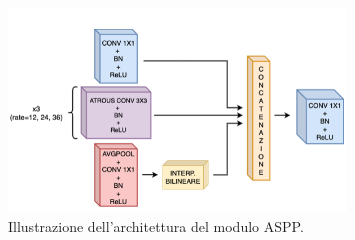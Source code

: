 \begin{figure}[h!]
    \centering
    \hspace*{-0.3in}
    \includegraphics[width=0.8\textwidth]{img/ASPP.png}
    \caption{Illustrazione dell'architettura del modulo ASPP.}
    \label{fig:aspp}
\end{figure}




























